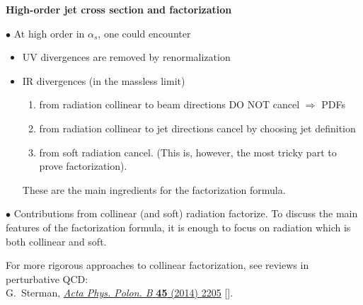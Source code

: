 \documentclass[9pt,a4paper,unknownkeysallowed,xcolor=dvipsnames,aspectratio=43]{beamer}
\begin{document}
\begin{frame}{\bf\huge High-order jet cross section and factorization}
\vspace{2mm}

{\color{darkred}\Large$\bullet$} At high order in $\alpha_s$, one could encounter
\vspace{2mm}
\begin{itemize}
    \item[\diamondsuit] {\color{darkred}UV divergences} are removed by renormalization
    \vspace{2mm}
    \item[\diamondsuit] {\color{darkred} IR divergences} (in the massless limit)
    \vspace{2mm}
    \begin{enumerate}
        \item {from radiation collinear to beam directions {\color{darkred}DO NOT} cancel } $\Rightarrow$ PDFs
        \vspace{2mm}
        \item {from radiation collinear to jet directions cancel} by choosing jet definition
        \vspace{2mm}
        \item {from soft radiation cancel}. (This is, however, the most tricky part to prove factorization).
    \end{enumerate}
    \vspace{2mm}
    These are the main ingredients for the factorization formula.
        \vspace{2mm}
\end{itemize}

{\color{darkred}\Large$\bullet$} {\color{darkred}Contributions from collinear (and soft) radiation factorize}. To discuss the main features of the factorization formula, it is enough to focus on radiation which is both collinear and soft.\\
\vspace{2mm}
    {\tiny For more rigorous approaches to collinear factorization, see reviews in perturbative QCD:\\\vspace{2mm} {\color{teablue}G.~Sterman, %
  \href{https://doi.org/10.5506/APhysPolB.45.2205}{\emph{Acta Phys. Polon. B}
  {\bfseries 45} (2014) 2205}
  [\href{https://arxiv.org/abs/1412.5698}{{}}].}
 \vspace{2mm}
 
}
\end{frame}
\end{document}
